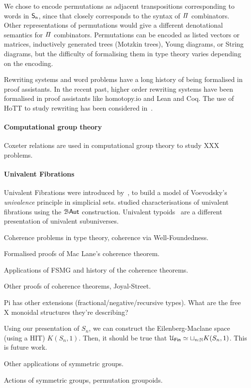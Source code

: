 We chose to encode permutations as adjacent transpositions corresponding to words in $\Sn$, since that closely
corresponds to the syntax of $\mathit{\Pi}$ combinators. Other representations of permutations would give a different
denotational semantics for $\mathit{\Pi}$ combinators. Permutations can be encoded as listed vectors or matrices, inductively
generated trees (Motzkin trees), Young diagrams, or String diagrams, but the difficulty of formalising them in type
theory varies depending on the encoding.

Rewriting systems and word problems have a long history of being formalised in proof assistants. In the recent past,
higher order rewriting systems have been formalised in proof assistants like {homotopy.io} and Lean and Coq. The use of
HoTT to study rewriting has been considered in~\cite{krausCoherenceWellFoundednessTaming2020}.

\paragraph{Computational group theory} Coxeter relations are used in computational group theory to study XXX problems.

\paragraph{Univalent Fibrations} Univalent Fibrations were introduced by~\citet*{kapulkinUnivalenceSimplicialSets2018},
to build a model of Voevodsky's \emph{univalence} principle in simplicial sets.
\citet{christensenCharacterizationUnivalentFibrations2015} studied characterisations of univalent fibrations using the
$\BAut$ construction. Univalent typoids~\cite{petrakisUnivalentTypoids2019a} are a different presentation of univalent
subuniverses.

Coherence problems in type theory, coherence via Well-Foundedness.

Formalised proofs of Mac Lane's coherence theorem.

Applications of FSMG and history of the coherence theorems.

Other proofs of coherence theorems, Joyal-Street.

Pi has other extensions (fractional/negative/recursive types).
What are the free X monoidal structures they're describing?

Using our presentation of $S_{n}$, we can construct the Eilenberg-Maclane space (using a HIT) $K(S_{n},1)$. Then, it
should be true that $\UFin \eqv \sqcup_{n:\Nat} K(S_{n},1)$. This is future work.

Other applications of symmetric groups.

Actions of symmetric groups, permutation groupoids.

